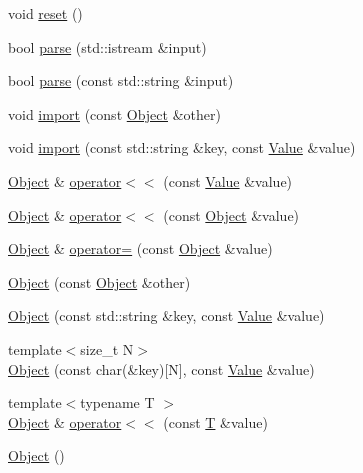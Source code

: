 \begin{DoxyCompactItemize}
void \hyperlink{classjsonxx_1_1_object_a3f7350672e4b24b869d0a0db804656b2}{reset} ()
\item 
bool \hyperlink{classjsonxx_1_1_object_a3e44c6d5d666260fe71e97554b7fd064}{parse} (std\+::istream \&input)
\item 
bool \hyperlink{classjsonxx_1_1_object_a47ea79b45b1835b48e4b476c1262e043}{parse} (const std\+::string \&input)
\item 
void \hyperlink{classjsonxx_1_1_object_a8edcd474c4d95435f140344e4315c532}{import} (const \hyperlink{classjsonxx_1_1_object}{Object} \&other)
\item 
void \hyperlink{classjsonxx_1_1_object_aeb845054d8332110e5eb220ba0da5b36}{import} (const std\+::string \&key, const \hyperlink{classjsonxx_1_1_value}{Value} \&value)
\item 
\hyperlink{classjsonxx_1_1_object}{Object} \& \hyperlink{classjsonxx_1_1_object_a8ff34caae5e5efc40ffb95edc1c1a2e7}{operator$<$$<$} (const \hyperlink{classjsonxx_1_1_value}{Value} \&value)
\item 
\hyperlink{classjsonxx_1_1_object}{Object} \& \hyperlink{classjsonxx_1_1_object_aa551f12db9c9f42ed67ea73fde5dc4e8}{operator$<$$<$} (const \hyperlink{classjsonxx_1_1_object}{Object} \&value)
\item 
\hyperlink{classjsonxx_1_1_object}{Object} \& \hyperlink{classjsonxx_1_1_object_aca850ab6e41e273bce140aa2398311de}{operator=} (const \hyperlink{classjsonxx_1_1_object}{Object} \&value)
\item 
\hyperlink{classjsonxx_1_1_object_ae0ccdde1acc4a57262304a2d2f6dcd3f}{Object} (const \hyperlink{classjsonxx_1_1_object}{Object} \&other)
\item 
\hyperlink{classjsonxx_1_1_object_adffab98b45e7b85a84634c2ddb50978c}{Object} (const std\+::string \&key, const \hyperlink{classjsonxx_1_1_value}{Value} \&value)
\item 
{\footnotesize template$<$size\+\_\+t N$>$ }\\\hyperlink{classjsonxx_1_1_object_a31c9f8a65e7a8a6f7569edb7e626efc5}{Object} (const char(\&key)\mbox{[}N\mbox{]}, const \hyperlink{classjsonxx_1_1_value}{Value} \&value)
\item 
{\footnotesize template$<$typename T $>$ }\\\hyperlink{classjsonxx_1_1_object}{Object} \& \hyperlink{classjsonxx_1_1_object_ac4974bfebe7a874a93963c7b791f7403}{operator$<$$<$} (const \hyperlink{http__parser_8c_ad24d0de3f597ca60dd95c4bc59c2ff73}{T} \&value)
\item 
\hyperlink{classjsonxx_1_1_object_ada73d1b6614d97372349c2dc81fcf1cb}{Object} ()

\end{DoxyCompactItemize}
